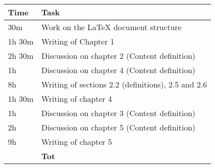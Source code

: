 \begin{center}
    {\renewcommand{\arraystretch}{2}%
    \begin{tabular}{L{2cm}L{12cm}}
        \hline
        \textbf{Time} & \textbf{Task} \\
        \hline
        30m & Work on the LaTeX document structure \\
        \hline
        1h 30m & Writing of Chapter 1 \\
        \hline
        2h 30m & Discussion on chapter 2 (Content definition) \\
        \hline
        1h & Discussion on chapter 4 (Content definition) \\
        \hline
        8h & Writing of sections 2.2 (definitions), 2.5 and 2.6 \\
        \hline
        1h 30m & Writing of chapter 4 \\
        \hline
        1h & Discussion on chapter 3 (Content definition) \\
        \hline
        2h & Discussion on chapter 5 (Content definition) \\
        \hline
        9h & Writing of chapter 5 \\
        \hline
        \textbf{} & \textbf{Tot} \\
    \end{tabular}}
\end{center}